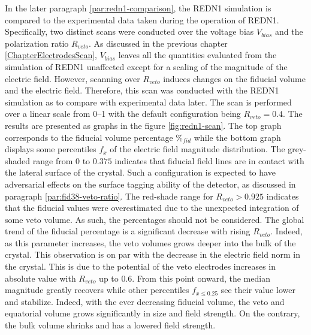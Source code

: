 In the later paragraph \ref{par:redn1-comparison}, the REDN1 simulation is compared to the experimental data taken during the operation of REDN1. Specifically, two distinct scans were conducted over the voltage bias $V_{bias}$ and the polarization ratio $R_{veto}$. As discussed in the previous chapter \ref{ChapterElectrodesScan}, $V_{bias}$ leaves all the quantities evaluated from the simulation of REDN1 unaffected except for a scaling of the magnitude of the electric field.
However, scanning over $R_{veto}$ induces changes on the fiducial volume and the electric field. Therefore, this scan was conducted with the REDN1 simulation as to compare with experimental data later. The scan is performed over a linear scale from \SIrange{0}{1}{} with the default configuration being $R_{veto} = 0.4$. The results are presented as graphs in the figure \ref{fig:redn1-scan}. The top graph corresponds to the fiducial volume percentage $\%_{fid}$ while the bottom graph displays some percentiles $f_x$ of the electric field magnitude distribution. 
The grey-shaded range from $0$ to $0.375$ indicates that fiducial field lines are in contact with the lateral surface of the crystal. Such a configuration is expected to have adversarial effects on the surface tagging ability of the detector, as discussed in paragraph \ref{par:fid38-veto-ratio}.
The red-shade range for $R_{veto} > 0.925$ indicates that the fiducial values were overestimated due to the unexpected integration of some veto volume. As such, the percentages should not be considered.
The global trend of the fiducial percentage is a significant decrease with rising $R_{veto}$. Indeed, as this parameter increases, the veto volumes grows deeper into the bulk of the crystal. This observation is on par with the decrease in the electric field norm in the crystal. This is due to the potential of the veto electrodes increases in absolute value with $R_{veto}$ up to $0.6$. From this point onward, the median magnitude greatly recovers while other percentiles $f_{x \leq 0.25}$ see their value lower and stabilize. Indeed, with the ever decreasing fiducial volume, the veto and equatorial volume grows significantly in size and field strength. On the contrary, the bulk volume shrinks and has a lowered field strength.

